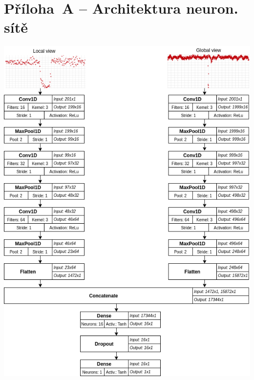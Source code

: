 \documentclass[a4paper,12pt]{article}
\begin{document}
{{{{{{{{{{{{{\section*{Příloha~A -- Architektura neuron. sítě}\label{priloha_a}
\includegraphics[width=\linewidth]{img/lc_cnn.png}

}}}}}}}}}}}}}
\end{document}
